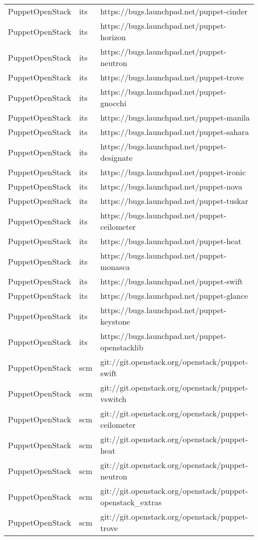 \begin{center}
\begin{longtable}{|p{4cm}|p{1cm}|p{10cm}|}
PuppetOpenStack&its&https://bugs.launchpad.net/puppet-cinder\\ 
PuppetOpenStack&its&https://bugs.launchpad.net/puppet-horizon\\ 
PuppetOpenStack&its&https://bugs.launchpad.net/puppet-neutron\\ 
PuppetOpenStack&its&https://bugs.launchpad.net/puppet-trove\\ 
PuppetOpenStack&its&https://bugs.launchpad.net/puppet-gnocchi\\ 
PuppetOpenStack&its&https://bugs.launchpad.net/puppet-manila\\ 
PuppetOpenStack&its&https://bugs.launchpad.net/puppet-sahara\\ 
PuppetOpenStack&its&https://bugs.launchpad.net/puppet-designate\\ 
PuppetOpenStack&its&https://bugs.launchpad.net/puppet-ironic\\ 
PuppetOpenStack&its&https://bugs.launchpad.net/puppet-nova\\ 
PuppetOpenStack&its&https://bugs.launchpad.net/puppet-tuskar\\ 
PuppetOpenStack&its&https://bugs.launchpad.net/puppet-ceilometer\\ 
PuppetOpenStack&its&https://bugs.launchpad.net/puppet-heat\\ 
PuppetOpenStack&its&https://bugs.launchpad.net/puppet-monasca\\ 
PuppetOpenStack&its&https://bugs.launchpad.net/puppet-swift\\ 
PuppetOpenStack&its&https://bugs.launchpad.net/puppet-glance\\ 
PuppetOpenStack&its&https://bugs.launchpad.net/puppet-keystone\\ 
PuppetOpenStack&its&https://bugs.launchpad.net/puppet-openstacklib\\ 
PuppetOpenStack&scm&git://git.openstack.org/openstack/puppet-swift\\ 
PuppetOpenStack&scm&git://git.openstack.org/openstack/puppet-vswitch\\ 
PuppetOpenStack&scm&git://git.openstack.org/openstack/puppet-ceilometer\\ 
PuppetOpenStack&scm&git://git.openstack.org/openstack/puppet-heat\\ 
PuppetOpenStack&scm&git://git.openstack.org/openstack/puppet-neutron\\ 
PuppetOpenStack&scm&git://git.openstack.org/openstack/puppet-openstack\_extras\\ 
PuppetOpenStack&scm&git://git.openstack.org/openstack/puppet-trove\\ 

\end{longtable}
\end{center}
